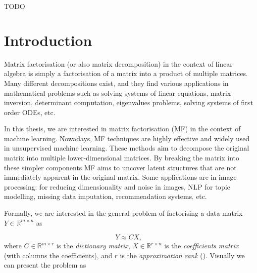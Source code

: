 \documentclass{mldsmsc}
\begin{document}
\begin{acknowledgements}

TODO 

\end{acknowledgements}


\tableofcontents

\mainmatter


\chapter{Introduction}

Matrix factorisation (or also matrix decomposition) in the context of linear algebra is simply a factorisation of a matrix into a product of multiple matrices. Many different decompositions exist, and they find various applications in mathematical problems such as solving systems of linear equations, matrix inversion, determinant computation, eigenvalues problems, solving systems of first order ODEs, etc. \newline

\noindent In this thesis, we are interested in matrix factorisation (MF) in the context of machine learning. Nowadays, MF techniques are highly effective and widely used in unsupervised machine learning. These methods aim to decompose the original matrix into multiple lower-dimensional matrices. By breaking the matrix into these simpler components MF aims to uncover latent structures that are not immediately apparent in the original matrix. Some applications are in image processing: for reducing dimensionality and noise in images, NLP for topic modelling, missing data imputation, recommendation systems, etc. \newline

\noindent Formally, we are interested in the general problem of factorising a data matrix $Y \in \mathbb{R}^{m \times n}$ as

\begin{equation}
Y \approx CX,
\end{equation} \newline
\noindent where $C \in \mathbb{R}^{m \times r}$ is the \textit{dictionary matrix}, $X \in \mathbb{R}^{r \times n}$ is the \textit{coefficients matrix} (with columns the coefficients), and $r$ is the \textit{approximation rank} (\cite{cite-key}). Visually we can present the problem as
\end{document}
